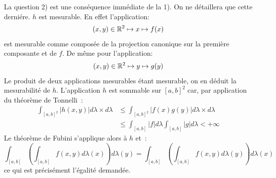 \documentclass[a4paper, 12pt]{amsart}
\begin{document}
La question 2) est une conséquence immédiate de la 1). On ne
détaillera que cette derniére.
$h$ est mesurable. En effet l'application:
\[
 (x,y) \in \mathbb{R}^2 \mapsto x \mapsto f(x)
\]
est mesurable comme composée de la projection canonique sur la première
composante et de $f$. De même pour l'application:
\[
 (x,y) \in \mathbb{R}^2 \mapsto y \mapsto g(y)
\]
Le produit de deux applications mesurables étant mesurable, on en déduit la
mesurabilité de $h$.
L'application $h$ est sommable sur $[a,b]^2$ car, par application du
théorème de Tonnelli~:
\begin{align*}
\int_{[a,b]^2} |h(x,y)| d \lambda \times d \lambda & \leq
\int_{[a,b]^2} |f(x)g(y)|  d \lambda \times d \lambda \\
& \leq \int_{[a,b]} |f| d \lambda \int_{[a,b]} |g| d \lambda < +\infty
\end{align*}
Le théorème de Fubini s'applique alors à $h$ et~:
\[
\int_{[a,b]} \left ( \int_{[a,b]} f(x,y) d \lambda(x) \right ) d
\lambda(y) = \int_{[a,b]} \left ( \int_{[a,b]} f(x,y) d \lambda(y)
\right ) d
\lambda(x)
\]
ce qui est précisément l'égalité demandée.
\end{document}
